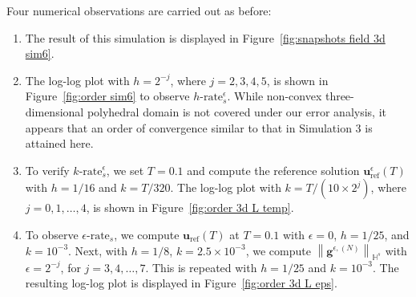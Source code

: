 \documentclass[11pt,reqno]{amsart}
\theoremstyle{definition}
\numberwithin{equation}{section}
\newcommand{\bff}{\boldsymbol}
\newcommand{\bb}{\mathbb}
\newcommand{\norm}[2]{\left\|{#1}\right\|_{#2}}
\begin{document}
{
Four numerical observations are carried out as before:
\begin{enumerate}
    \item[(O1)] The result of this simulation is displayed in Figure~\ref{fig:snapshots field 3d sim6}.

    \item[(O2)] The log-log plot with $h=2^{-j}$, where $j=2,3,4,5$, is shown in Figure~\ref{fig:order sim6} to observe $h\text{-rate}_s^\epsilon$. While non-convex three-dimensional polyhedral domain is not covered under our error analysis, it appears that an order of convergence similar to that in Simulation 3 is attained here.

    \item[(O3)] To verify $k\text{-rate}^\epsilon_s$, we set $T=0.1$ and compute the reference solution $\bff{u}^\epsilon_{\mathrm{ref}}(T)$ with $h=1/16$ and $k=T/320$. The log-log plot with $k=T/(10\times 2^j)$, where $j=0,1,\ldots,4$, is shown in Figure~\ref{fig:order 3d L temp}.

    \item[(O4)] To observe $\epsilon\text{-rate}_s$, we compute $\bff{u}_\mathrm{ref}(T)$ at $T=0.1$ with $\epsilon=0$, $h=1/25$, and $k=10^{-3}$. Next, with $h=1/8$, $k=2.5\times 10^{-3}$, we compute $\norm{\bff{g}^{\epsilon, (N)}}{\bb{H}^s}$ with $\epsilon=2^{-j}$, for $j=3,4,\ldots, 7$. This is repeated with $h=1/25$ and $k=10^{-3}$. The resulting log-log plot is displayed in Figure~\ref{fig:order 3d L eps}.
\end{enumerate}
}
\end{document}

